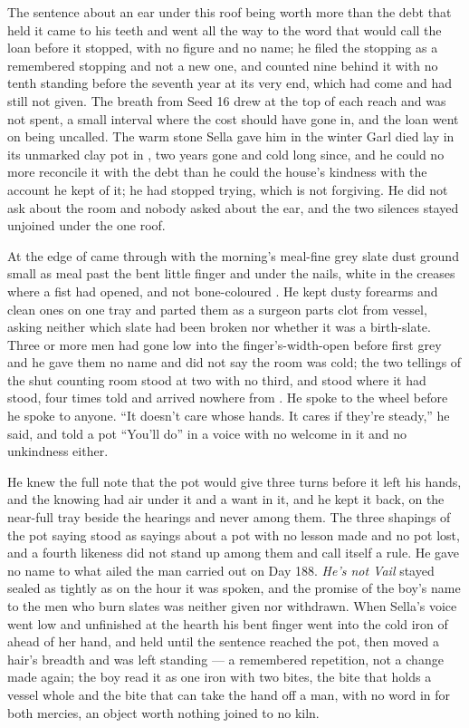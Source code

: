 The sentence about an ear under this roof being worth more than the debt that held it came to his teeth and went all the way to the word that would call the loan before it stopped, with no figure and no name; he filed the stopping as a remembered stopping and not a new one, and counted nine behind it with no tenth standing before the seventh year at its very end, which had come and had still not given. The breath from Seed 16 drew at the top of each reach and was not spent, a small interval where the cost should have gone in, and the loan went on being uncalled. The warm stone Sella gave him in the winter Garl died lay in its unmarked clay pot in , two years gone and cold long since, and he could no more reconcile it with the debt than he could the house's kindness with the account he kept of it; he had stopped trying, which is not forgiving. He did not ask about the room and nobody asked about the ear, and the two silences stayed unjoined under the one roof.

At the edge of   came through with the morning's meal-fine grey slate dust ground small as meal past the bent little finger and under the nails, white in the creases where a fist had opened, and not bone-coloured . He kept dusty forearms and clean ones on one tray and parted them as a surgeon parts clot from vessel, asking neither which slate had been broken nor whether it was a birth-slate. Three or more men had gone low into the finger's-width-open  before first grey and he gave them no name and did not say the room was cold; the two tellings of the shut counting room stood at two with no third, and  stood where it had stood, four times told and arrived nowhere from . He spoke to the wheel before he spoke to anyone. “It doesn't care whose hands. It cares if they're steady,” he said, and told a pot “You'll do” in a voice with no welcome in it and no unkindness either.

He knew the full note that the pot would give three turns before it left his hands, and the knowing had air under it and a want in it, and he kept it back, on the near-full tray beside the hearings and never among them. The three shapings of the pot saying stood as sayings about a pot with no lesson made and no pot lost, and a fourth likeness did not stand up among them and call itself a rule. He gave no name to what ailed the man carried out on Day 188. \emph{He's not Vail} stayed sealed as tightly as on the hour it was spoken, and the promise of the boy's name to the men who burn slates was neither given nor withdrawn. When Sella's voice went low and unfinished at the hearth his bent finger went into the cold iron of  ahead of her hand, and held until the sentence reached the pot, then moved a hair's breadth and was left standing --- a remembered repetition, not a change made again; the boy read it as one iron with two bites, the bite that holds a vessel whole and the bite that can take the hand off a man, with no word in  for both mercies, an object worth nothing joined to no kiln.

